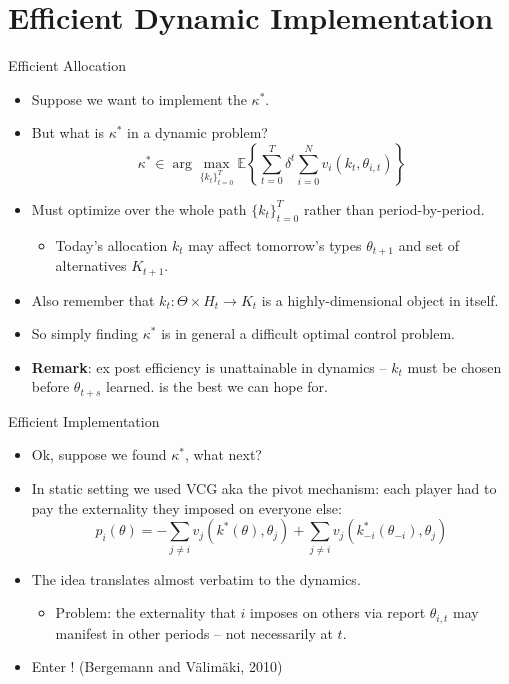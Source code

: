 \documentclass[english,10pt
,aspectratio=169
]{beamer}
\begin{document}
\section{Efficient Dynamic Implementation}

\begin{frame}{Efficient Allocation}
\begin{itemize}
	\item Suppose we want to implement the  $\kappa^*$.
	\item But what is $\kappa^*$ in a dynamic problem?
	$$ \kappa^* \in \arg \max_{\{k_t\}_{t=0}^T} \mathbb{E} \left\{ \sum_{t=0}^T \delta^t \sum_{i=0}^N v_i(k_t,\theta_{i,t}) \right\}$$
	\item Must optimize over the whole path $\{k_t\}_{t=0}^T$ rather than period-by-period.
	\begin{itemize}
		\item Today's allocation $k_t$ may affect tomorrow's types $\theta_{t+1}$ and set of alternatives $K_{t+1}$.
	\end{itemize}
	\item Also remember that $k_t : \Theta \times H_t \to K_t$ is a highly-dimensional object in itself.
	\item So simply finding $\kappa^*$ is in general a difficult optimal control problem.
	\item \textbf{Remark}: \alert{ex post efficiency} is \alert{unattainable} in dynamics -- $k_t$ must be chosen before $\theta_{t+s}$ learned.  is the best we can hope for.
\end{itemize}
\end{frame}


\begin{frame}{Efficient Implementation}
\begin{itemize}
	\item Ok, suppose we found $\kappa^*$, what next?
	\item In static setting we used VCG aka the pivot mechanism: each player had to pay the externality they imposed on everyone else:
	$$ p_i(\theta) = -\sum_{j \neq i} v_j \left( k^*(\theta),\theta_j \right) + \sum_{j \neq i} v_j \left( k^*_{-i}(\theta_{-i}),\theta_j \right) $$
	\item The idea translates almost verbatim to the dynamics.
	\begin{itemize}
		\item Problem: the externality that $i$ imposes on others via report $\theta_{i,t}$ may manifest in other periods -- not necessarily at $t$.
	\end{itemize}
	\item Enter ! (Bergemann and V{\"a}lim{\"a}ki, 2010)
\end{itemize}
\end{frame}
\end{document}
